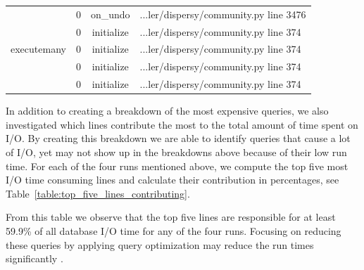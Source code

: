 \begin{table}[!h]
{\begin{tabular}{|c|c|c|l|}
		\multicolumn{1}{|c|}{\multirow{5}{*}{executemany}} & \multicolumn{1}{c|}{0} & \multicolumn{1}{c|}{on\_undo} & \multicolumn{1}{l|}{...ler/dispersy/community.py line 3476} \\ \cline{2-4}
		\multicolumn{1}{|c|}{} & \multicolumn{1}{c|}{0}  & \multicolumn{1}{c|}{initialize}  & \multicolumn{1}{l|}{...ler/dispersy/community.py line 374}  \\ \cline{2-4} 
		\multicolumn{1}{|c|}{} & \multicolumn{1}{c|}{0}  & \multicolumn{1}{c|}{initialize}  & \multicolumn{1}{l|}{...ler/dispersy/community.py line 374}  \\ \cline{2-4} 
		\multicolumn{1}{|c|}{} & \multicolumn{1}{c|}{0}  & \multicolumn{1}{c|}{initialize}  & \multicolumn{1}{l|}{...ler/dispersy/community.py line 374}  \\ \cline{2-4} 
		\multicolumn{1}{|c|}{} & \multicolumn{1}{c|}{0}  & \multicolumn{1}{c|}{initialize}  & \multicolumn{1}{l|}{...ler/dispersy/community.py line 374}  \\ \hline 
	\end{tabular}}
\end{table}

In addition to creating a breakdown of the most expensive queries, we also investigated which lines contribute the most to the total amount of time spent on I/O.
By creating this breakdown we are able to identify queries that cause a lot of I/O, yet may not show up in the breakdowns above because of their low run time.
For each of the four runs mentioned above, we compute the top five most I/O time consuming lines and calculate their contribution in percentages, see Table~\ref{table:top_five_lines_contributing}.

From this table we observe that the top five lines are responsible for at least 59.9\% of all database I/O time for any of the four runs.
Focusing on reducing these queries by applying query optimization may reduce the run times significantly \cite{jarke1984query}.

